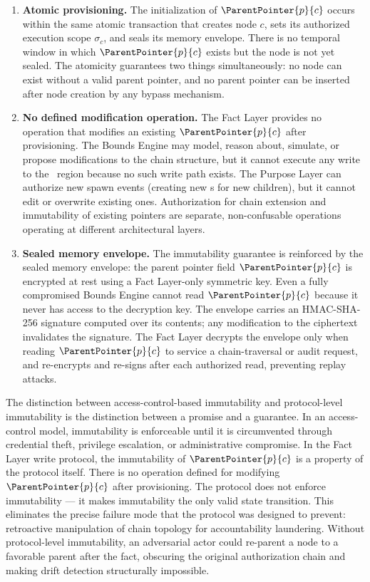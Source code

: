 \begin{enumerate}
    \item \textbf{Atomic provisioning.} The initialization of $\ParentPointer{p}{c}$ occurs within the same atomic transaction that creates node $c$, sets its authorized execution scope $\sigma_c$, and seals its memory envelope. There is no temporal window in which $\ParentPointer{p}{c}$ exists but the node is not yet sealed. The atomicity guarantees two things simultaneously: no node can exist without a valid parent pointer, and no parent pointer can be inserted after node creation by any bypass mechanism.

    \item \textbf{No defined modification operation.} The Fact Layer provides no operation that modifies an existing $\ParentPointer{p}{c}$ after provisioning. The Bounds Engine may model, reason about, simulate, or propose modifications to the chain structure, but it cannot execute any write to the \ParentPointer\ region because no such write path exists. The Purpose Layer can authorize new spawn events (creating new \ParentPointer s for new children), but it cannot edit or overwrite existing ones. Authorization for chain extension and immutability of existing pointers are separate, non-confusable operations operating at different architectural layers.

    \item \textbf{Sealed memory envelope.} The immutability guarantee is reinforced by the sealed memory envelope: the parent pointer field $\ParentPointer{p}{c}$ is encrypted at rest using a Fact Layer-only symmetric key. Even a fully compromised Bounds Engine cannot read $\ParentPointer{p}{c}$ because it never has access to the decryption key. The envelope carries an HMAC-SHA-256 signature computed over its contents; any modification to the ciphertext invalidates the signature. The Fact Layer decrypts the envelope only when reading $\ParentPointer{p}{c}$ to service a chain-traversal or audit request, and re-encrypts and re-signs after each authorized read, preventing replay attacks.
\end{enumerate}

The distinction between access-control-based immutability and protocol-level immutability is the distinction between a promise and a guarantee. In an access-control model, immutability is enforceable until it is circumvented through credential theft, privilege escalation, or administrative compromise. In the Fact Layer write protocol, the immutability of $\ParentPointer{p}{c}$ is a property of the protocol itself. There is no operation defined for modifying $\ParentPointer{p}{c}$ after provisioning. The protocol does not enforce immutability --- it makes immutability the only valid state transition. This eliminates the precise failure mode that the protocol was designed to prevent: retroactive manipulation of chain topology for accountability laundering. Without protocol-level immutability, an adversarial actor could re-parent a node to a favorable parent after the fact, obscuring the original authorization chain and making drift detection structurally impossible.

